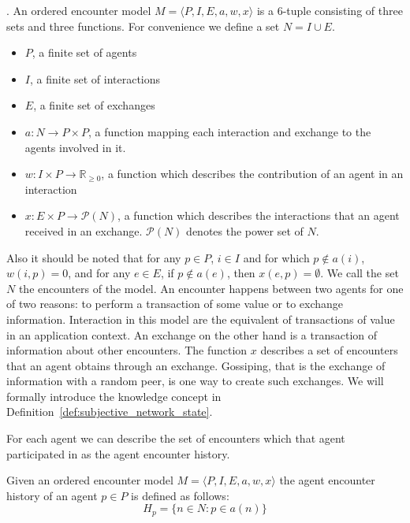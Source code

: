 \begin{defn}. 
    \label{def:base}
    An ordered encounter model $M = \langle P, I, E, a, w, x \rangle$ is a 6-tuple consisting
     of three sets and three functions. For convenience we define a set $N = I \cup E$. 
    \begin{itemize}
        \item $P$, a finite set of agents
        \item $I$, a finite set of interactions
        \item $E$, a finite set of exchanges
        \item $a : N \rightarrow P \times P$, a function mapping each interaction and exchange to the agents 
        involved in it.
        \item $w : I \times P \rightarrow \mathbb{R}_{\geq0}$, a function which describes the 
        contribution of an agent in an interaction
        \item $x : E \times P \rightarrow \mathcal{P}(N)$, a function which describes the interactions that an 
        agent received in an exchange. $\mathcal{P}(N)$ denotes the power set of $N$.
    \end{itemize}
\end{defn}

Also it should be noted that for any $p \in P$, $i \in I$ and for which $p \notin a(i)$, $w(i,p) = 0$, 
and for any $e \in E$, if $p \notin a(e)$, then $x(e, p) = \emptyset$.
We call the set $N$ the encounters of the model. An encounter happens between two agents for one of
two reasons: to perform a transaction of some value or to exchange information.
Interaction in this model are the equivalent of transactions of value in an application context. 
An exchange on the other hand is a transaction of information about other encounters.
The function $x$ describes a set of encounters that an agent obtains through an 
exchange. Gossiping, that is the exchange of information with a random peer, is one way to create 
such exchanges. We will formally introduce the 
knowledge concept in Definition~\ref{def:subjective_network_state}.

For each agent we can describe the set of encounters which that agent participated in as the agent 
encounter history. 

\begin{defn}
    Given an ordered encounter model $M = \langle P, I, E, a, w, x \rangle$ the agent encounter history of an agent $p \in P$ is defined as follows:
    \begin{equation}
        H_p = \{ n \in N : p \in a(n) \}
    \end{equation}
\end{defn}


